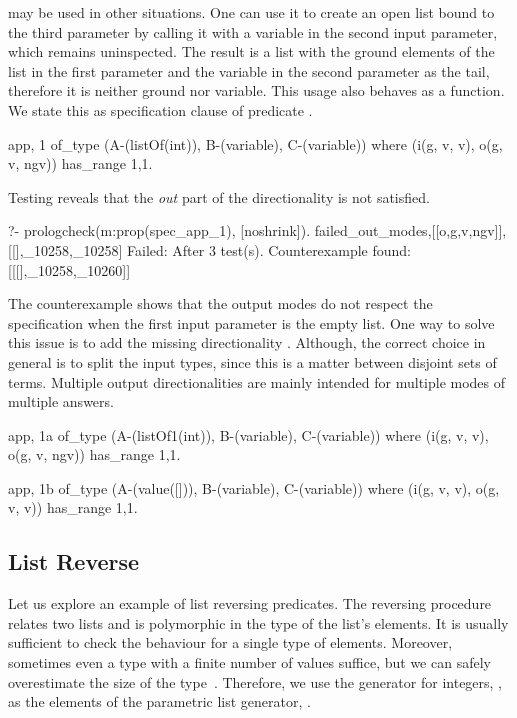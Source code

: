  may be used in other situations.
%
One can use it to create an open list bound to the third
parameter by calling it with a variable in the second input parameter,
which remains uninspected.
%
The result is a list with the ground elements of the list in the first
parameter and the variable in the second parameter as the tail,
therefore it is neither ground nor variable.
%
This usage also behaves as a function.
%
We state this as specification clause  of predicate .
%
\begin{yapcode}
 {app, 1} of_type (A-(listOf(int)), B-(variable), C-(variable))
   where (i(g, v, v), o(g, v, ngv))  has_range {1,1}.
\end{yapcode}
%
Testing 
reveals that the \emph{out} part of
the directionality is not satisfied.
\begin{yapcode}
  ?- prologcheck(m:prop(spec_app_1), [noshrink]).
 {failed_out_modes,[[o,g,v,ngv]], [[],_10258,_10258]}
 Failed: After 3 test(s).
 Counterexample found: [[[],_10258,_10260]] 
\end{yapcode}
%
The counterexample shows that the output modes do not respect the
specification when the first input parameter is the empty
list.
%
One way to solve this issue is to add the missing directionality
.
%
Although, the correct choice in general is to split the input types,
since this is a matter between disjoint sets of terms.
%
Multiple output directionalities are mainly intended for multiple modes
of multiple answers.
%
\begin{yapcode}
 {app, 1a} of_type (A-(listOf1(int)), B-(variable), C-(variable))
   where (i(g, v, v), o(g, v, ngv))  has_range {1,1}.

 {app, 1b} of_type (A-(value([])), B-(variable), C-(variable))
   where (i(g, v, v), o(g, v, v))  has_range {1,1}.
\end{yapcode}





\subsection{List Reverse}

Let us explore an example of list reversing predicates.
%
The reversing procedure relates two lists and is
polymorphic in the type of the list's elements.
%
It is usually sufficient to check the behaviour for a
single type of elements.
%
Moreover, sometimes even a type with a finite number of values suffice,
but we can safely overestimate the size of the
type~\cite{Bernardy-testing-poly-prop}.
%
Therefore, we use the generator for integers, , as the elements
of the parametric list generator, .



